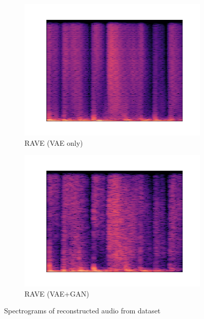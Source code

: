 \documentclass{article}
\begin{document}
\begin{figure}[h!]
\begin{subfigure}[t]{0.4\textwidth}
\centering
\includegraphics[width=\textwidth]{examples/rave_vae.wav.png}
\caption{RAVE (VAE only)}
\label{figure:reco-ravenogan}
\end{subfigure} \hfill
\begin{subfigure}[t]{0.4\textwidth}
\centering
\includegraphics[width=\textwidth]{examples/rave.wav.png}
\caption{RAVE (VAE+GAN)}
\label{figure:reco-ravegan}
\end{subfigure}

\caption[Hello]{Spectrograms of reconstructed audio from dataset}
\label{figure:reconstruction}
\end{figure}
\end{document}
